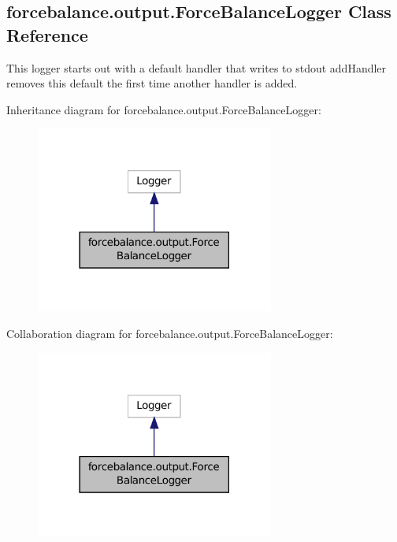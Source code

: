 \hypertarget{classforcebalance_1_1output_1_1ForceBalanceLogger}{\subsection{forcebalance.\-output.\-Force\-Balance\-Logger Class Reference}
\label{classforcebalance_1_1output_1_1ForceBalanceLogger}
}


This logger starts out with a default handler that writes to stdout add\-Handler removes this default the first time another handler is added.  




Inheritance diagram for forcebalance.\-output.\-Force\-Balance\-Logger\-:
\nopagebreak
\begin{figure}[H]
\begin{center}
\leavevmode
\includegraphics[width=222pt]{classforcebalance_1_1output_1_1ForceBalanceLogger__inherit__graph}
\end{center}
\end{figure}


Collaboration diagram for forcebalance.\-output.\-Force\-Balance\-Logger\-:
\nopagebreak
\begin{figure}[H]
\begin{center}
\leavevmode
\includegraphics[width=222pt]{classforcebalance_1_1output_1_1ForceBalanceLogger__coll__graph}
\end{center}
\end{figure}
